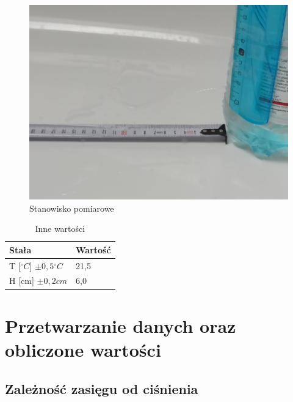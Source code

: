 \documentclass[a4paper,12pt]{article}
\newcommand{\stopnie}{\ensuremath{^{\circ}}}
\begin{document}
\begin{figure}[hbt]
	\includegraphics[scale=.05]{stanowisko.jpg}
	\centering
	\caption{Stanowisko pomiarowe}\label{fig:stanowisko}
\end{figure}

\begin{table}[hbt]
\centering
\begin{tabular}{|l|l|}
\hline
Stała                                 & Wartość \\ \hline\hline
T [$\stopnie C$] $\pm 0,5 \stopnie C$ & 21,5    \\ \hline
H [cm] $\pm 0,2cm$                    & 6,0     \\ \hline
\end{tabular}
\caption{Inne wartości}
\label{tab:stale}
\end{table}

\clearpage

\section{Przetwarzanie danych oraz obliczone wartości}

\subsection*{Zależność zasięgu od ciśnienia}
\end{document}
